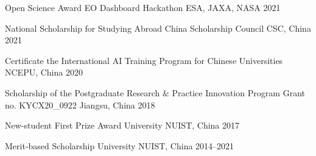 


\begin{cvhonors}

  \cvhonor
    {Open Science Award} %
    {EO Dashboard Hackathon} %
    {ESA, JAXA, NASA} %
    {2021} %

  \cvhonor
    {National Scholarship for Studying Abroad} %
    {China Scholarship Council} %
    {CSC, China} %
    {2021} %

  \cvhonor
    {Certificate} %
    {the International AI Training Program for Chinese Universities} %
    {NCEPU, China} %
    {2020} %

  \cvhonor
    {Scholarship of the Postgraduate Research \& Practice Innovation Program} %
    {Grant no. KYCX20\_0922} %
    {Jiangsu, China} %
    {2018} %

  \cvhonor
    {New-student First Prize Award} %
    {University} %
    {NUIST, China} %
    {2017} %

  \cvhonor
    {Merit-based Scholarship} %
    {University} %
    {NUIST, China} %
    {2014--2021} %

\end{cvhonors}
